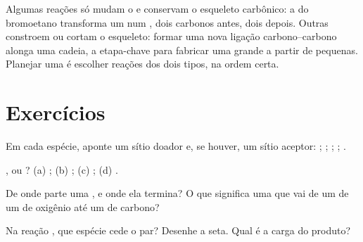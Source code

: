 \begin{remark}\label{rem:g12:curly-arrows:skeleton}
Algumas reações só mudam o  e conservam o esqueleto
carbônico: a  do bromoetano transforma um  num
, dois carbonos antes, dois depois. Outras constroem ou cortam o
esqueleto: formar uma nova ligação carbono--carbono alonga uma cadeia, a
etapa-chave para fabricar uma  grande a partir de 
pequenas. Planejar uma  é escolher reações dos dois tipos, na
ordem certa.
\end{remark}

\section{Exercícios}

\begin{exercise}[$\star$]\label{exo:g12:curly-arrows:1}
Em cada espécie, aponte um sítio doador e, se houver, um sítio aceptor:
; ; ; ; .
\end{exercise}

\begin{exercise}[$\star$]\label{exo:g12:curly-arrows:2}
,  ou ?
(a) ;
(b) ;
(c) ;
(d) .
\end{exercise}

\begin{exercise}[$\star$]\label{exo:g12:curly-arrows:3}
De onde parte uma , e onde ela termina? O que significa uma
 que vai de um  de um  de oxigênio até um
 de carbono?
\end{exercise}

\begin{exercise}[$\star$]\label{exo:g12:curly-arrows:4}
Na reação , que espécie cede o par? Desenhe a seta.
Qual é a carga do produto?
\end{exercise}

